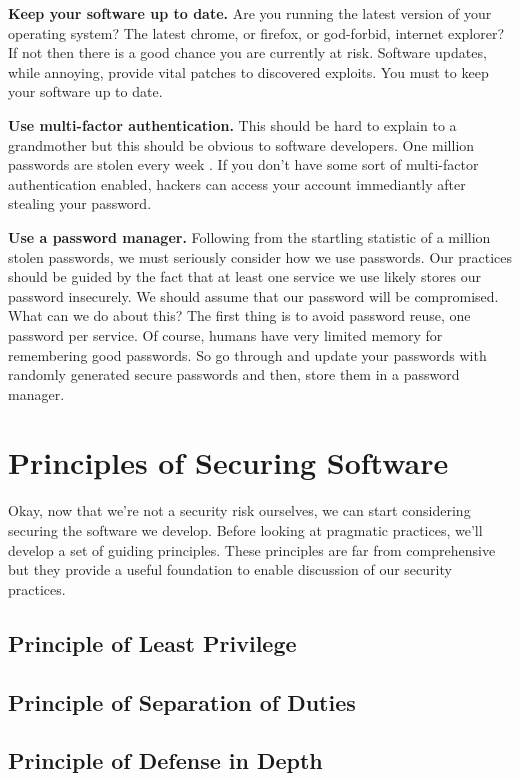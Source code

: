 \textbf{Keep your software up to date.}
Are you running the latest version of your operating system?
The latest chrome, or firefox, or god-forbid, internet explorer?
If not then there is a good chance you are currently at risk.
Software updates, while annoying, provide vital patches to discovered exploits.
You must to keep your software up to date.

\textbf{Use multi-factor authentication.}
This should be hard to explain to a grandmother but this should be obvious to software developers.
One million passwords are stolen every week \cite{password-security}.
If you don't have some sort of multi-factor authentication enabled, hackers can access your account immediantly after stealing your password.

\textbf{Use a password manager.}
Following from the startling statistic of a million stolen passwords, we must seriously consider how we use passwords.
Our practices should be guided by the fact that at least one service we use likely stores our password insecurely.
We should assume that our password will be compromised.
What can we do about this?
The first thing is to avoid password reuse, one password per service.
Of course, humans have very limited memory for remembering good passwords.
So go through and update your passwords with randomly generated secure passwords and then, store them in a password manager.


\section{Principles of Securing Software}
Okay, now that we're not a security risk ourselves, we can start considering securing the software we develop.
Before looking at pragmatic practices, we'll develop a set of guiding principles.
These principles are far from comprehensive but they provide a useful foundation to enable discussion of our security practices.

\subsection{Principle of Least Privilege}
\subsection{Principle of Separation of Duties}
\subsection{Principle of Defense in Depth}
